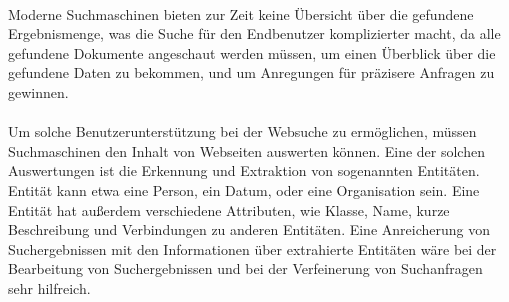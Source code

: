\paragraph{}
Moderne Suchmaschinen bieten zur Zeit keine Übersicht über die gefundene Ergebnismenge, was die Suche für den Endbenutzer komplizierter macht, da alle gefundene Dokumente angeschaut werden müssen, um einen Überblick über die gefundene Daten zu bekommen, und um Anregungen für präzisere Anfragen zu gewinnen.

\paragraph{}
Um solche Benutzerunterstützung bei der Websuche zu ermöglichen, müssen Suchmaschinen den Inhalt von Webseiten auswerten können. Eine der solchen Auswertungen ist die Erkennung und Extraktion von sogenannten Entitäten. Entität kann etwa eine Person, ein Datum, oder eine Organisation sein. Eine Entität hat außerdem verschiedene Attributen, wie Klasse, Name, kurze Beschreibung und Verbindungen zu anderen Entitäten. Eine Anreicherung von Suchergebnissen mit den Informationen über extrahierte Entitäten wäre bei der Bearbeitung von Suchergebnissen und bei der Verfeinerung von Suchanfragen sehr hilfreich.